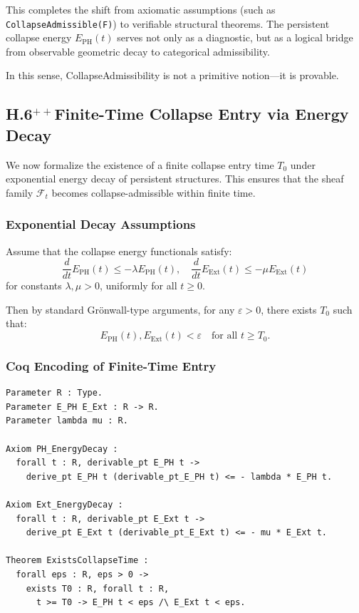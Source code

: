 \documentclass[11pt]{article}
\begin{document}
This completes the shift from axiomatic assumptions (such as \texttt{CollapseAdmissible(F)}) to verifiable structural theorems. The persistent collapse energy \( E_{\mathrm{PH}}(t) \) serves not only as a diagnostic, but as a logical bridge from observable geometric decay to categorical admissibility.

In this sense, CollapseAdmissibility is not a primitive notion—it is provable.

\subsection{H.6$^{++}$Finite-Time Collapse Entry via Energy Decay}
\label{sec:collapse-entry-energy-decay}

We now formalize the existence of a finite collapse entry time \( T_0 \) under exponential energy decay of persistent structures. This ensures that the sheaf family \( \mathcal{F}_t \) becomes collapse-admissible within finite time.

\subsubsection*{Exponential Decay Assumptions}

Assume that the collapse energy functionals satisfy:
\[
\frac{d}{dt} E_{\mathrm{PH}}(t) \leq -\lambda E_{\mathrm{PH}}(t), \quad
\frac{d}{dt} E_{\mathrm{Ext}}(t) \leq -\mu E_{\mathrm{Ext}}(t)
\]
for constants \( \lambda, \mu > 0 \), uniformly for all \( t \geq 0 \).

Then by standard Grönwall-type arguments, for any \( \varepsilon > 0 \), there exists \( T_0 \) such that:
\[
E_{\mathrm{PH}}(t), E_{\mathrm{Ext}}(t) < \varepsilon \quad \text{for all } t \geq T_0.
\]

\subsubsection*{Coq Encoding of Finite-Time Entry}

\begin{lstlisting}[language=Coq, caption=Collapse Entry Time under Exponential Decay]
Parameter R : Type.
Parameter E_PH E_Ext : R -> R.
Parameter lambda mu : R.

Axiom PH_EnergyDecay :
  forall t : R, derivable_pt E_PH t ->
    derive_pt E_PH t (derivable_pt_E_PH t) <= - lambda * E_PH t.

Axiom Ext_EnergyDecay :
  forall t : R, derivable_pt E_Ext t ->
    derive_pt E_Ext t (derivable_pt_E_Ext t) <= - mu * E_Ext t.

Theorem ExistsCollapseTime :
  forall eps : R, eps > 0 ->
    exists T0 : R, forall t : R,
      t >= T0 -> E_PH t < eps /\ E_Ext t < eps.
\end{lstlisting}
\end{document}
